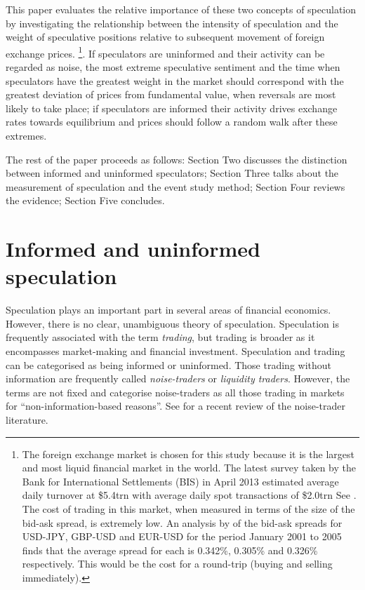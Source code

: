 \documentclass{article}
\begin{document}
This paper evaluates the relative importance of these two concepts of speculation by investigating the relationship between the intensity of speculation and the weight of speculative positions relative to subsequent movement of foreign exchange prices. \footnote{\label{FX}The foreign exchange market is chosen for this study because it is the largest and most liquid financial market in the world.  The latest survey taken by the Bank for International Settlements (BIS) in April 2013 estimated average daily turnover at \$5.4trn with average daily spot transactions of \$2.0trn See \citet{BISFX2013}.  The cost of trading in this market, when measured in terms of the size of the bid-ask spread, is extremely low. An analysis by \citet{Steely2013} of the bid-ask spreads for USD-JPY, GBP-USD and EUR-USD for the period January 2001 to 2005 finds that the average spread for each is 0.342\%, 0.305\% and 0.326\% respectively.  This would be the cost for a round-trip (buying and selling immediately).}.  If speculators are uninformed and their activity can be regarded as noise, the most extreme speculative sentiment and the time when speculators have the greatest weight in the market should correspond with the greatest deviation of prices from fundamental value, when reversals are most likely to take place; if speculators are informed their activity drives exchange rates towards equilibrium and prices should follow a random walk after these extremes.  

The rest of the paper proceeds as follows:  Section Two discusses the distinction between informed and uninformed speculators; Section Three talks about the measurement of speculation and the event study method; Section Four reviews the evidence; Section Five concludes. 

\section{Informed and uninformed speculation}
Speculation plays an important part in several areas of financial economics.  However, there is no clear, unambiguous theory of speculation.  Speculation is frequently associated with the term \emph{trading}, but trading is broader as it encompasses market-making and financial investment. Speculation and trading can be categorised as being informed or uninformed. Those trading without information are frequently called \emph{noise-traders} or \emph{liquidity traders}.  However, the terms are not fixed and  \citet[p. 1]{GortonNoise} categorise noise-traders as all those trading in markets for ``non-information-based reasons''.  See \citet{Ramiah201589} for a recent review of the noise-trader literature. 
\end{document}
